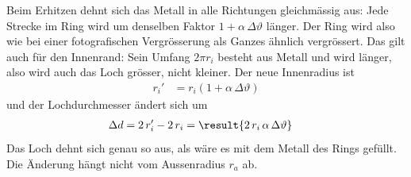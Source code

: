 \begin{center}
\end{center}

Beim Erhitzen dehnt sich das Metall in alle Richtungen gleichmässig aus: Jede Strecke im Ring wird um denselben Faktor $1+\alpha\,\Delta\vartheta$ länger. Der Ring wird also wie bei einer fotografischen Vergrösserung als Ganzes ähnlich vergrössert. Das gilt auch für den Innenrand: Sein Umfang $2\pi r_i$ besteht aus Metall und wird länger, also wird auch das Loch grösser, nicht kleiner. Der neue Innenradius ist
\begin{align}
 r_i' &= r_i\left(1+\alpha\,\Delta\vartheta\right)
\end{align}
und der Lochdurchmesser ändert sich um
\begin{align}
 \Delta d &= 2\,r_i' - 2\,r_i = \result{2\,r_i\,\alpha\,\Delta\vartheta}
\end{align}
Das Loch dehnt sich genau so aus, als wäre es mit dem Metall des Rings gefüllt. Die Änderung hängt nicht vom Aussenradius $r_a$ ab.
